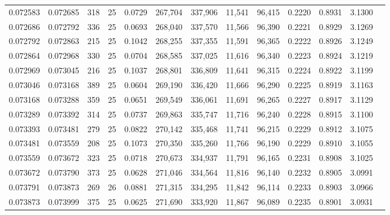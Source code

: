 \begin{tabular}{rrrrrrrrrrrrr}
0.072583 & 0.072685 &   318 &  25 &                                     0.0729 & 267,704 & 337,906 &  11,541 &  96,415 & 0.2220 & 0.8931 & 3.1300 \\
0.072686 & 0.072792 &   336 &  25 &                                     0.0693 & 268,040 & 337,570 &  11,566 &  96,390 & 0.2221 & 0.8929 & 3.1269 \\
0.072792 & 0.072863 &   215 &  25 &                                     0.1042 & 268,255 & 337,355 &  11,591 &  96,365 & 0.2222 & 0.8926 & 3.1249 \\
0.072864 & 0.072968 &   330 &  25 &                                     0.0704 & 268,585 & 337,025 &  11,616 &  96,340 & 0.2223 & 0.8924 & 3.1219 \\
0.072969 & 0.073045 &   216 &  25 &                                     0.1037 & 268,801 & 336,809 &  11,641 &  96,315 & 0.2224 & 0.8922 & 3.1199 \\
0.073046 & 0.073168 &   389 &  25 &                                     0.0604 & 269,190 & 336,420 &  11,666 &  96,290 & 0.2225 & 0.8919 & 3.1163 \\
0.073168 & 0.073288 &   359 &  25 &                                     0.0651 & 269,549 & 336,061 &  11,691 &  96,265 & 0.2227 & 0.8917 & 3.1129 \\
0.073289 & 0.073392 &   314 &  25 &                                     0.0737 & 269,863 & 335,747 &  11,716 &  96,240 & 0.2228 & 0.8915 & 3.1100 \\
0.073393 & 0.073481 &   279 &  25 &                                     0.0822 & 270,142 & 335,468 &  11,741 &  96,215 & 0.2229 & 0.8912 & 3.1075 \\
0.073481 & 0.073559 &   208 &  25 &                                     0.1073 & 270,350 & 335,260 &  11,766 &  96,190 & 0.2229 & 0.8910 & 3.1055 \\
0.073559 & 0.073672 &   323 &  25 &                                     0.0718 & 270,673 & 334,937 &  11,791 &  96,165 & 0.2231 & 0.8908 & 3.1025 \\
0.073672 & 0.073790 &   373 &  25 &                                     0.0628 & 271,046 & 334,564 &  11,816 &  96,140 & 0.2232 & 0.8905 & 3.0991 \\
0.073791 & 0.073873 &   269 &  26 &                                     0.0881 & 271,315 & 334,295 &  11,842 &  96,114 & 0.2233 & 0.8903 & 3.0966 \\
0.073873 & 0.073999 &   375 &  25 &                                     0.0625 & 271,690 & 333,920 &  11,867 &  96,089 & 0.2235 & 0.8901 & 3.0931 \\

\end{tabular}
